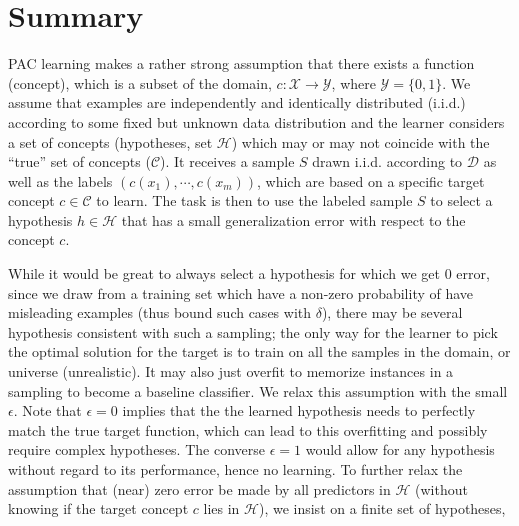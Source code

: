 \section{Summary}
PAC learning makes a rather strong assumption that there exists a function
(concept),
which is a subset of the domain, $c:\mathcal{X} \rightarrow \mathcal{Y}$, where
$\mathcal{Y}=\{0,1\}$.
We assume that examples are independently and identically distributed (i.i.d.)
according to some
fixed but unknown data distribution and the learner considers a set of concepts
(hypotheses, set $\mathcal{H}$)
which may or may not coincide with the ``true'' set of concepts
($\mathcal{C}$).  It receives a sample $S$ drawn i.i.d.
according to $\mathcal{D}$ as well as the labels $(c(x_1), \cdots , c(x_m))$,
which are based on a
specific target concept $c \in \mathcal{C}$ to learn. The task is then to
use the labeled sample $S$
to select a hypothesis $h \in \mathcal{H}$ that has a small generalization
error with respect to the concept $c$.\par
While it would be great to always select a hypothesis for which we get 0
error, since we draw from a training set which have a non-zero probability of
have misleading examples (thus bound such cases with $\delta$),
there may be several hypothesis consistent with such a sampling; the only way
for the learner to
pick the optimal solution for the target is to train on all the samples in the
domain, or universe (unrealistic). It may also just overfit to memorize
instances in a
sampling to become a baseline classifier. We relax this assumption with the
small
$\epsilon$. Note that $\epsilon = 0$
implies that the the learned hypothesis needs to perfectly match the true
target function, which can lead to this overfitting and possibly require
complex
hypotheses. The converse $\epsilon = 1$ would
allow for any hypothesis without regard to its performance, hence no learning.
To
further relax the assumption that (near) zero error be made by all predictors
in
$\mathcal{H}$ (without knowing if the target concept $c$ lies in
$\mathcal{H}$), we insist on a finite set of hypotheses,
